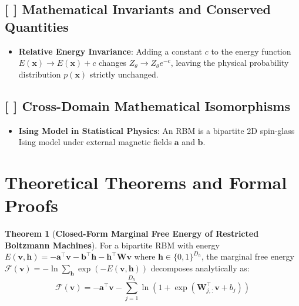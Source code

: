 \documentclass[11pt,a4paper]{article}
\theoremstyle{definition}
\newtheorem{theorem}{\textbf{Theorem}}[section]
\begin{document}
\subsection{[ ] Mathematical Invariants and Conserved Quantities}
\begin{itemize}
    \item \textbf{Relative Energy Invariance}: Adding a constant $c$ to the energy function $E(\mathbf{x}) \to E(\mathbf{x}) + c$ changes $Z_\theta \to Z_\theta e^{-c}$, leaving the physical probability distribution $p(\mathbf{x})$ strictly unchanged.
\end{itemize}

\subsection{[ ] Cross-Domain Mathematical Isomorphisms}
\begin{itemize}
    \item \textbf{Ising Model in Statistical Physics}: An RBM is a bipartite 2D spin-glass Ising model under external magnetic fields $\mathbf{a}$ and $\mathbf{b}$.
\end{itemize}

\section{Theoretical Theorems and Formal Proofs}

\begin{theorem}[\textbf{Closed-Form Marginal Free Energy of Restricted Boltzmann Machines}]
For a bipartite RBM with energy $E(\mathbf{v}, \mathbf{h}) = -\mathbf{a}^\top \mathbf{v} - \mathbf{b}^\top \mathbf{h} - \mathbf{h}^\top \mathbf{W} \mathbf{v}$ where $\mathbf{h} \in \{0, 1\}^{D_h}$, the marginal free energy $\mathcal{F}(\mathbf{v}) = -\ln \sum_{\mathbf{h}} \exp(-E(\mathbf{v}, \mathbf{h}))$ decomposes analytically as:
{\boldmath
\begin{equation}
\mathcal{F}(\mathbf{v}) = -\mathbf{a}^\top \mathbf{v} - \sum_{j=1}^{D_h} \ln\left( 1 + \exp\left( \mathbf{W}_{j, :}^\top \mathbf{v} + b_j \right) \right)
\end{equation}
}
\end{theorem}
\end{document}

